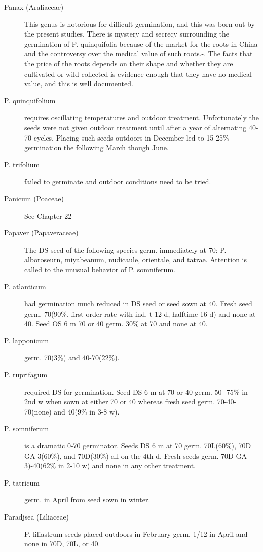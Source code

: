\begin{description}
\item[Panax (Araliaceae)] This genus is notorious for difficult germination, and
this was born out by the present studies. There is mystery and secrecy surrounding
the germination of P. quinquifolia because of the market for the roots in China and the
controversy over the medical value of such roots.-. The facts that the price of the roots
depends on their shape and whether they are cultivated or wild collected is evidence
enough that they have no medical value, and this is well documented.
\item[P. quinquifolium] requires oscillating temperatures and outdoor treatment.
Unfortunately the seeds were not given outdoor treatment until after a year of
alternating 40-70 cycles. Placing such seeds outdoors in December led to 15-25\%
germination the following March though June.
\item[P. trifolium] failed to germinate and outdoor conditions need to be tried.
\item[Panicum (Poaceae)] See Chapter 22
\item[Papaver (Papaveraceae)] The DS seed of the following species germ.
immediately at 70: P. alboroseurn, miyabeanum, nudicaule, orientale, and tatrae.
Attention is called to the unusual behavior of P. somniferum.
\item[P. atlanticum] had germination much reduced in DS seed or seed sown at 40.
Fresh seed germ. 70(90\%, first order rate with ind. t 12 d, halftime 16 d) and none at
40. Seed OS 6 m 70 or 40 germ. 30\% at 70 and none at 40.

\item[P. lapponicum] germ. 70(3\%) and 40-70(22\%).
\item[P. ruprifagum] required DS for germination. Seed DS 6 m at 70 or 40 germ. 50-
75\% in 2nd w when sown at either 70 or 40 whereas fresh seed germ. 70-40-
70(none) and 40(9\% in 3-8 w).
\item[P. somniferum] is a dramatic 0-70 germinator. Seeds DS 6 m at 70 germ.
70L(60\%), 70D GA-3(60\%), and 70D(30\%) all on the 4th d. Fresh seeds germ. 70D
GA-3)-40(62\% in 2-10 w) and none in any other treatment.
\item[P. tatricum] germ. in April from seed sown in winter.

\item[Paradjsea (Liliaceae)] P. liliastrum seeds placed outdoors in February
germ. 1/12 in April and none in 70D, 70L, or 40.


\end{description}

